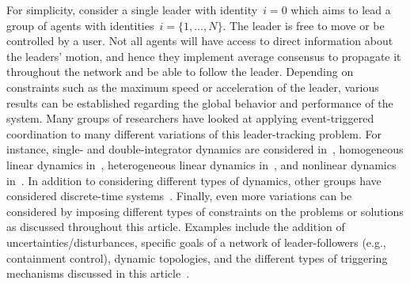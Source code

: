 \documentclass{autart}
\newcommand{\until}[1]{\{1,\dots, #1\}}
\begin{document}
{For simplicity, consider a single leader with identity~$i =
  0$ which aims to lead a group of agents with identities~$i =
  \until{N}$. The leader is free to move or be controlled by a
  user. Not all agents will have access to direct information about
  the leaders' motion, and hence they implement average consensus to
  propagate it throughout the network and be able to follow the
  leader.  %
  Depending on constraints such as the maximum speed or acceleration
  of the leader, various results can be established regarding the
  global behavior and performance of the system.  } Many groups of
researchers have looked at applying event-triggered coordination to
many different variations of this leader-tracking problem. For
instance, single- and double-integrator dynamics are considered
in~\citep{KL-ZJ-GX-RX:16}, homogeneous linear dynamics
in~\citep{CT-KZ-JMS-WED:14,YC-VU:16,WZ-ZJ:15}, heterogeneous linear
dynamics in~\cite{EG-YC-DWC:17b}, and nonlinear dynamics
in~\cite{AA-FA-DL-GS-DVD-MB-KHJ:15,XZ-LL-GF:15,HL-GC-LX:17}. In
addition to considering different types of dynamics, other groups have
considered discrete-time systems~\citep{MC-LZ-HS-CL:15}. Finally, even
more variations can be considered by imposing different types of
constraints on the problems or solutions as discussed throughout this
article. Examples include the addition of uncertainties/disturbances,
specific goals of a network of leader-followers (e.g., containment
control), dynamic topologies, and the different types of triggering
mechanisms discussed in this
article~\citep{HL-XL-TH-WZ:15,HL-GC-XL-TH:16,WX-DH-LL-JC:17,NM-XL-TH:15}.
\end{document}
